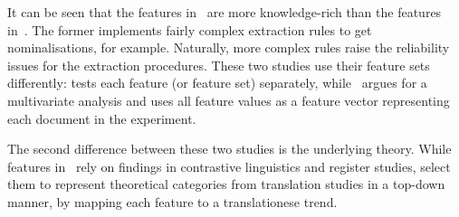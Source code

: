 It can be seen that the features in~\citet{Evert2017} are more knowledge-rich than the features in~\citet{Volansky2015}. The former implements fairly complex extraction rules to get nominalisations, for example. Naturally, more complex rules raise the reliability issues for the extraction procedures. These two studies use their feature sets differently: \citet{Volansky2015} tests each feature (or feature set) separately, while~\citet{Evert2017} argues for a multivariate analysis and uses all feature values as a feature vector representing each document in the experiment.   


%

The second difference between these two studies is the underlying theory. While features in~\citet{Evert2017} rely on findings in contrastive linguistics and register studies, \citet{Volansky2015} select them to represent theoretical categories from translation studies in a top-down manner, by mapping each feature to a translationese trend. 

